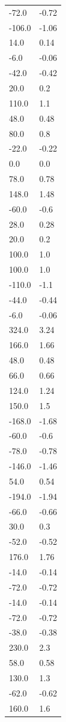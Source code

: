 \begin{longtable}{ll}
-72.0 & -0.72 \\
-106.0 & -1.06 \\
14.0 & 0.14 \\
-6.0 & -0.06 \\
-42.0 & -0.42 \\
20.0 & 0.2 \\
110.0 & 1.1 \\
48.0 & 0.48 \\
80.0 & 0.8 \\
-22.0 & -0.22 \\
0.0 & 0.0 \\
78.0 & 0.78 \\
148.0 & 1.48 \\
-60.0 & -0.6 \\
28.0 & 0.28 \\
20.0 & 0.2 \\
100.0 & 1.0 \\
100.0 & 1.0 \\
-110.0 & -1.1 \\
-44.0 & -0.44 \\
-6.0 & -0.06 \\
324.0 & 3.24 \\
166.0 & 1.66 \\
48.0 & 0.48 \\
66.0 & 0.66 \\
124.0 & 1.24 \\
150.0 & 1.5 \\
-168.0 & -1.68 \\
-60.0 & -0.6 \\
-78.0 & -0.78 \\
-146.0 & -1.46 \\
54.0 & 0.54 \\
-194.0 & -1.94 \\
-66.0 & -0.66 \\
30.0 & 0.3 \\
-52.0 & -0.52 \\
176.0 & 1.76 \\
-14.0 & -0.14 \\
-72.0 & -0.72 \\
-14.0 & -0.14 \\
-72.0 & -0.72 \\
-38.0 & -0.38 \\
230.0 & 2.3 \\
58.0 & 0.58 \\
130.0 & 1.3 \\
-62.0 & -0.62 \\
160.0 & 1.6 \\

\end{longtable}
